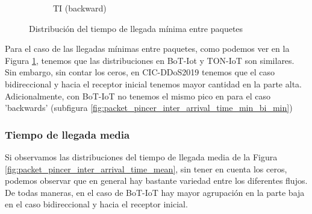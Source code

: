 \begin{figure}[H]
\begin{subfigure}[b]{0.26\textwidth}
        \caption{TI (backward)}
    \end{subfigure}
    \hfill
       \caption{Distribución del tiempo de llegada mínima entre paquetes}
       \label{fig:packet_pincer_inter_arrival_time_min}
\end{figure}

Para el caso de las llegadas mínimas entre paquetes, como podemos ver en la Figura \ref{fig:packet_pincer_inter_arrival_time_min}, tenemos que las distribuciones en BoT-Iot y TON-IoT son similares. Sin embargo, sin contar los ceros, en CIC-DDoS2019 tenemos que el caso bidireccional y hacia el receptor inicial tenemos mayor cantidad en la parte alta. Adicionalmente, con BoT-IoT no tenemos el mismo pico en para el caso 'backwards' (subfigura \ref{fig:packet_pincer_inter_arrival_time_min_bi_min})

\subsubsection{Tiempo de llegada media}

Si observamos las distribuciones del tiempo de llegada media de la Figura \ref{fig:packet_pincer_inter_arrival_time_mean}, sin tener en cuenta los ceros, podemos observar que en general hay bastante variedad entre los diferentes flujos. De todas maneras, en el caso de BoT-IoT hay mayor agrupación en la parte baja en el caso bidireccional y hacia el receptor inicial.

